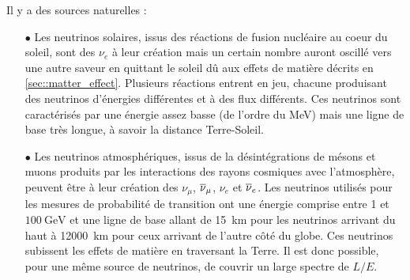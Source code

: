       Il y a des sources naturelles :
      \begin{itemize}
        \item[$\bullet$] Les neutrinos solaires, issus des réactions de fusion nucléaire au coeur du soleil, sont des $\nu_e$ à leur création mais un certain nombre auront oscillé vers une autre saveur en quittant le soleil dû aux effets de matière décrits en \autoref{sec::matter_effect}. Plusieurs réactions entrent en jeu, chacune produisant des neutrinos d'énergies différentes et à des flux différents. %
        Ces neutrinos sont caractérisés par une énergie assez basse (de l'ordre du \si{\mega\electronvolt}) mais une ligne de base très longue, à savoir la distance Terre-Soleil.
        \item[$\bullet$] Les neutrinos atmosphériques, issus de la désintégrations de mésons et muons produits par les interactions des rayons cosmiques avec l'atmosphère, peuvent être à leur création des $\nu_{\mu}$, $\overline{\nu}_{\mu}$, $\nu_e$ et $\overline{\nu}_e$. Les neutrinos utilisés pour les mesures de probabilité de transition ont une énergie comprise entre 1 et $\SI{100}{\giga\electronvolt}$ et une ligne de base allant de \SI{15}{\kilo\meter} pour les neutrinos arrivant du haut à \SI{12000}{\kilo\meter} pour ceux arrivant de l'autre côté du globe. Ces neutrinos subissent les effets de matière en traversant la Terre. Il est donc possible, pour une même source de neutrinos, de couvrir un large spectre de $L/E$. %
      \end{itemize}

